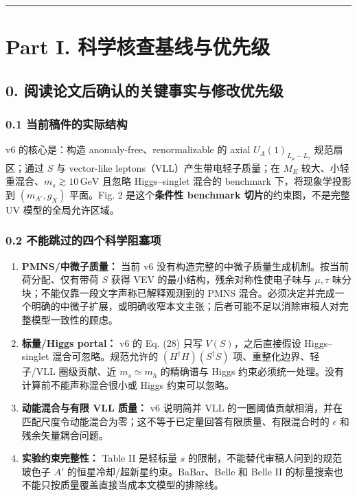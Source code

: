 \documentclass[
]{article}
\providecommand{\tightlist}{%
  \setlength{\itemsep}{0pt}\setlength{\parskip}{0pt}}
\begin{document}
\begin{center}\rule{0.5\linewidth}{0.5pt}\end{center}

\section{Part I.
科学核查基线与优先级}\label{part-i.-ux79d1ux5b66ux6838ux67e5ux57faux7ebfux4e0eux4f18ux5148ux7ea7}

\subsection{0.
阅读论文后确认的关键事实与修改优先级}\label{ux9605ux8bfbux8bbaux6587ux540eux786eux8ba4ux7684ux5173ux952eux4e8bux5b9eux4e0eux4feeux6539ux4f18ux5148ux7ea7}

\subsubsection{0.1
当前稿件的实际结构}\label{ux5f53ux524dux7a3fux4ef6ux7684ux5b9eux9645ux7ed3ux6784}

v6 的核心是：构造 anomaly-free、renormalizable 的 axial
\(U_A(1)_{L_\mu-L_\tau}\) 规范扇区；通过 \(S\) 与 vector-like
leptons（VLL）产生带电轻子质量；在 \(M_E\)
较大、小轻重混合、\(m_s\gtrsim10\,\mathrm{GeV}\) 且忽略 Higgs--singlet
混合的 benchmark 下，将现象学投影到 \((m_{A'},g_X)\) 平面。Fig. 2
是这个\textbf{条件性 benchmark 切片}的约束图，不是完整 UV
模型的全局允许区域。

\subsubsection{0.2
不能跳过的四个科学阻塞项}\label{ux4e0dux80fdux8df3ux8fc7ux7684ux56dbux4e2aux79d1ux5b66ux963bux585eux9879}

\begin{enumerate}
\def\labelenumi{\arabic{enumi}.}
\tightlist
\item
  \textbf{PMNS/中微子质量：} 当前 v6
  没有构造完整的中微子质量生成机制。按当前荷分配、仅有带荷 \(S\) 获得
  VEV 的最小结构，残余对称性使电子味与 \(\mu,\tau\)
  味分块；不能仅靠一段文字声称已解释观测到的 PMNS
  混合。必须决定并完成一个明确的中微子扩展，或明确收窄本文主张；后者可能不足以消除审稿人对完整模型一致性的顾虑。
\item
  \textbf{标量/Higgs portal：} v6 的 Eq. (28) 只写
  \(V(S)\)，之后直接假设 Higgs--singlet 混合可忽略。规范允许的
  \((H^\dagger H)(S^\dagger S)\) 项、重整化边界、轻子/VLL 圈级贡献、近
  \(m_s\simeq m_h\) 的精确谱与 Higgs
  约束必须统一处理。没有计算前不能声称混合很小或 Higgs 约束可以忽略。
\item
  \textbf{动能混合与有限 VLL 质量：} v6 说明简并 VLL
  的一圈阈值贡献相消，并在匹配尺度令动能混合为零；这不等于已定量回答有限质量、有限混合时的
  \(\epsilon\) 和残余矢量耦合问题。
\item
  \textbf{实验约束完整性：} Table II 是轻标量 \(s\)
  的限制，不能替代审稿人问到的规范玻色子 \(A'\)
  的恒星冷却/超新星约束。BaBar、Belle 和 Belle II
  的标量搜索也不能只按质量覆盖直接当成本文模型的排除线。
\end{enumerate}
\end{document}

